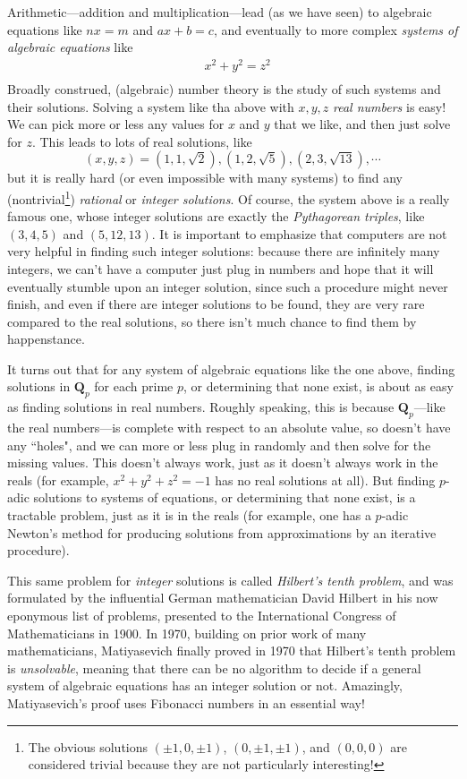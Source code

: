 \documentclass[11pt]{amsart}
\newcommand*{\Q}{\ensuremath{\mathbf{Q}}}
\theoremstyle{plain}
\theoremstyle{definition}
\theoremstyle{remark}
\numberwithin{theorem}{section}
\numberwithin{equation}{section}
\begin{document}
Arithmetic---addition and multiplication---lead (as we have seen) to 
algebraic equations like $nx=m$ and $ax+b=c$, and eventually to more complex {\em systems of algebraic equations}
like
\begin{align*}
	&x^2 + y^2 = z^2\\
\end{align*}
Broadly construed, (algebraic) number theory is the study of such systems and their solutions.  
Solving a system like tha above with $x,y,z$ {\em real numbers} is easy!  We can pick more or less
any values for $x$ and $y$ that we like, and then just solve for $z$.  This leads to lots of real solutions, like
$$
(x,y,z) = (1,1,\sqrt{2}), (1,2,\sqrt{5}), (2,3,\sqrt{13}),\cdots
$$
but it is really hard (or even impossible with many systems) to find any (nontrivial\footnote{The obvious solutions 
$(\pm1,0,\pm1)$, $(0,\pm 1, \pm 1)$, and $(0,0,0)$ are considered trivial because they are not particularly interesting!
}) {\em rational} or {\em integer solutions}.
Of course, the system above is a really famous one, whose integer solutions are exactly the {\em Pythagorean triples},
like $(3,4,5)$ and $(5,12,13)$.  It is important to emphasize that computers are not very helpful in finding such integer solutions:
because there are infinitely many integers, we can't have a computer just plug in numbers and hope that it will eventually stumble upon an integer solution,
since such a procedure might never finish, and even if there are integer solutions to be found, they are very rare compared to the real solutions,
so there isn't much chance to find them by happenstance.  

It turns out that for any system of algebraic equations like the one above, 
finding solutions in $\Q_p$ for each prime $p$, or determining that none exist, 
is about as easy as finding solutions in real numbers.  Roughly speaking, this is because $\Q_p$---like the real numbers---is complete
with respect to an absolute value, so doesn't have any ``holes", and we can more or less plug in randomly and then solve for the missing values.
This doesn't always work, just as it doesn't always work in the reals (for example, $x^2+y^2+z^2 = -1$ has no real solutions at all).
But finding $p$-adic solutions to systems of equations, or determining that none exist, is a tractable problem,
just as it is in the reals (for example, one has a $p$-adic Newton's method for producing solutions from approximations by an iterative procedure).

This same problem for {\em integer} solutions is called {\em Hilbert's tenth problem}, and was formulated by the influential 
German mathematician David Hilbert in his now eponymous list of problems, presented to the International Congress of Mathematicians in 1900.
In 1970, building on prior work of many mathematicians, Matiyasevich finally proved in 1970 that Hilbert's tenth problem is {\em unsolvable},
meaning that there can be no algorithm to decide if a general system of algebraic equations has an integer solution or not.
Amazingly, Matiyasevich's proof uses Fibonacci numbers in an essential way!
\end{document}
